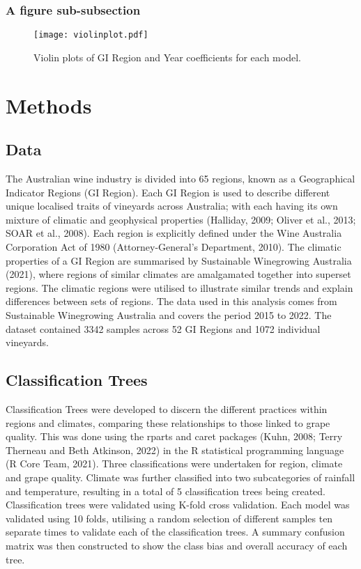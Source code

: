 \documentclass[review,12pt,authoryear]{elsarticle}
\begin{document}
\begin{linenumbers}
\subsubsection{A figure sub-subsection}

\begin{figure}
    \texttt{[image: violinplot.pdf]}
    \caption{Violin plots of GI Region and Year coefficients for each model.}\label{fig:violin}
    \end{figure}
\fi{}

\section{Methods}

\subsection{Data}
The Australian wine industry is divided into 65 regions, known as a Geographical Indicator Regions (GI Region). Each GI Region is used to describe different unique localised traits of vineyards across Australia; with each having its own mixture of climatic and geophysical properties (Halliday, 2009; Oliver et al., 2013; SOAR et al., 2008). Each region is explicitly defined under the Wine Australia Corporation Act of 1980 (Attorney-General's Department, 2010). The climatic properties of a GI Region are summarised by Sustainable Winegrowing Australia (2021), where regions of similar climates are amalgamated together into superset regions. The climatic regions were utilised to illustrate similar trends and explain differences between sets of regions.
The data used in this analysis comes from Sustainable Winegrowing Australia and covers the period 2015 to 2022. The dataset contained 3342 samples across 52 GI Regions and 1072 individual vineyards.

\subsection{Classification Trees}

Classification Trees were developed to discern the different practices within regions and climates,  comparing these relationships to those linked to grape quality. This was done using the rparts and caret packages (Kuhn, 2008; Terry Therneau and Beth Atkinson, 2022) in the R statistical programming language (R Core Team, 2021). Three classifications were undertaken for region, climate and grape quality. Climate was further classified into two subcategories of rainfall and temperature, resulting in a total of 5 classification trees being created.
Classification trees were validated using K-fold cross validation. Each model was validated using 10 folds, utilising a random selection of different samples ten separate times to validate each of the  classification trees. A summary confusion matrix was then constructed to show the class bias and overall accuracy of each tree.


\end{linenumbers}
\end{document}
